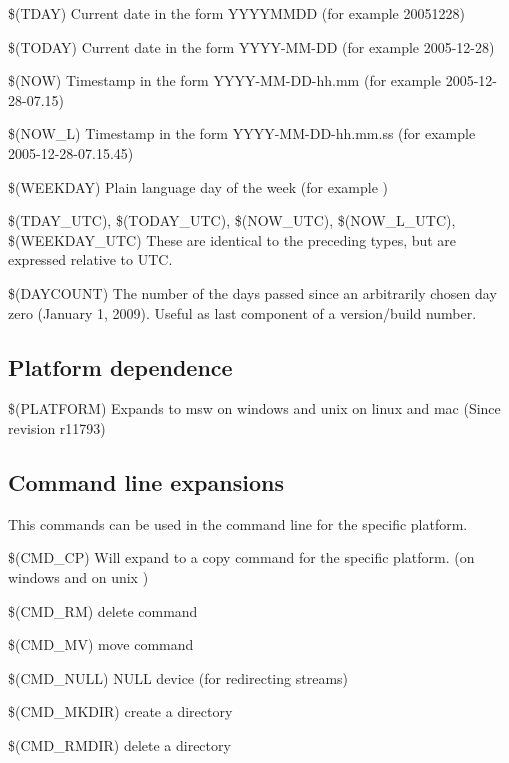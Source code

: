 \begin{codeentry}
\item[\$(TDAY)] Current date in the form YYYYMMDD (for example 20051228)
\item[\$(TODAY)] Current date in the form YYYY-MM-DD (for example 2005-12-28)
\item[\$(NOW)] Timestamp in the form YYYY-MM-DD-hh.mm (for example 2005-12-28-07.15)
\item[\$(NOW\_L)] Timestamp in the form YYYY-MM-DD-hh.mm.ss (for example 2005-12-28-07.15.45)
\item[\$(WEEKDAY)]  Plain language day of the week (for example )
\item[\$(TDAY\_UTC), \$(TODAY\_UTC), \$(NOW\_UTC), \$(NOW\_L\_UTC), \$(WEEKDAY\_UTC)] These are identical to the preceding types, but are expressed relative to UTC.
\item[\$(DAYCOUNT)] The number of the days passed since an arbitrarily chosen day zero (January 1, 2009). Useful as last component of a version/build number.
\end{codeentry}

\subsection{Platform dependence}

\begin{codeentry}
\item[\$(PLATFORM)] Expands to msw on windows and unix on linux and mac (Since revision r11793) 
\end{codeentry}

\subsection{Command line expansions}
This commands can be used in the command line for the specific platform. 
\begin{codeentry}
\item[\$(CMD\_CP)] Will expand to a copy command for the specific platform. (on windows  and on unix ) 
\item[\$(CMD\_RM)] delete command
\item[\$(CMD\_MV)] move command
\item[\$(CMD\_NULL)] NULL device (for redirecting streams)
\item[\$(CMD\_MKDIR)] create a directory
\item[\$(CMD\_RMDIR)] delete a directory
\end{codeentry}


